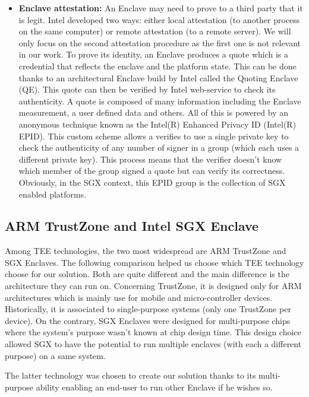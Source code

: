 \documentclass[../main.tex]{subfiles}
\begin{document}
\begin{itemize}
    \item \textbf{Enclave attestation:} An Enclave may need to prove to a third party that it is legit. Intel developed two ways: either local attestation (to another process on the same computer) or remote attestation (to a remote server). We will only focus on the second attestation procedure as the first one is not relevant in our work. To prove its identity, an Enclave produces a quote which is a credential that reflects the enclave and the platform state. This can be done thanks to an architectural Enclave build by Intel called the Quoting Enclave (QE). This quote can then be verified by Intel web-service to check its authenticity. A quote is composed of many information including the Enclave measurement, a user defined data and others. All of this is powered by an anonymous technique known as the Intel(R) Enhanced Privacy ID (Intel(R) EPID). This custom scheme allows a verifies to use a single private key to check the authenticity of any number of signer in a group (which each uses a different private key). This process means that the verifier doesn't know which member of the group signed a quote but can verify its correctness. Obviously, in the SGX context, this EPID group is the collection of SGX enabled platforms.
\end{itemize}


\subsection{ARM TrustZone and Intel SGX Enclave}
\label{section:theoric:tee_trustzone_vs_sgx}
\par Among TEE technologies, the two most widespread are ARM TrustZone and SGX Enclaves. The following comparison helped us choose which TEE technology choose for our solution. Both are quite different and the main difference is the architecture they can run on. Concerning TrustZone, it is designed only for ARM architectures which is mainly use for mobile and micro-controller devices. Historically, it is associated to single-purpose systems (only one TrustZone per device). On the contrary, SGX Enclaves were designed for multi-purpose chips where the system's purpose wasn't known at chip design time. This design choice allowed SGX to have the potential to run multiple enclaves (with each a different purpose) on a same system.
\par The latter technology was chosen to create our solution thanks to its multi-purpose ability enabling an end-user to run other Enclave if he wishes so.
\end{document}
